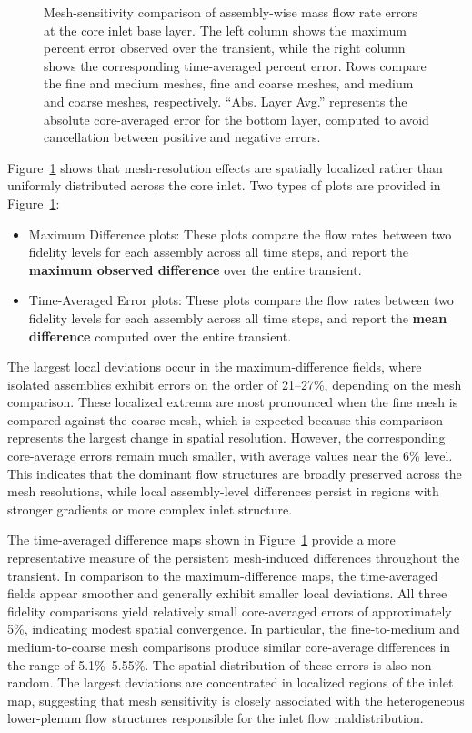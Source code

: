 \documentclass[review]{elsarticle}
\theoremstyle{definition}
\theoremstyle{definition}
\theoremstyle{remark}
\begin{document}
\begin{figure}[h!]
    \caption{Mesh-sensitivity comparison of assembly-wise mass flow rate errors at the core inlet base layer. The left column shows the maximum percent error observed over the transient, while the right column shows the corresponding time-averaged percent error. Rows compare the fine and medium meshes, fine and coarse meshes, and medium and coarse meshes, respectively. ``Abs. Layer Avg.'' represents the absolute core-averaged error for the bottom layer, computed to avoid cancellation between positive and negative errors.}
    \label{fig:Error_Vis_BaseLayer}
\end{figure}

Figure~\ref{fig:Error_Vis_BaseLayer} shows that mesh-resolution effects are spatially localized rather than uniformly distributed across the core inlet. Two types of plots are provided in Figure~\ref{fig:Error_Vis_BaseLayer}:

\begin{itemize}
    \item Maximum Difference plots: These plots compare the flow rates between two fidelity levels for each assembly across all time steps, and report the \textbf{maximum observed difference} over the entire transient.  
    
    \item Time-Averaged Error plots: These plots compare the flow rates between two fidelity levels for each assembly across all time steps, and report the \textbf{mean difference} computed over the entire transient.  
\end{itemize}

The largest local deviations occur in the maximum-difference fields, where isolated assemblies exhibit errors on the order of 21--27\%, depending on the mesh comparison. These localized extrema are most pronounced when the fine mesh is compared against the coarse mesh, which is expected because this comparison represents the largest change in spatial resolution. However, the corresponding core-average errors remain much smaller, with average values near the 6\% level. This indicates that the dominant flow structures are broadly preserved across the mesh resolutions, while local assembly-level differences persist in regions with stronger gradients or more complex inlet structure.

The time-averaged difference maps shown in Figure~\ref{fig:Error_Vis_BaseLayer} provide a more representative measure of the persistent mesh-induced differences throughout the transient. In comparison to the maximum-difference maps, the time-averaged fields appear smoother and generally exhibit smaller local deviations. All three fidelity comparisons yield relatively small core-averaged errors of approximately 5\%, indicating modest spatial convergence. In particular, the fine-to-medium and medium-to-coarse mesh comparisons produce similar core-average differences in the range of 5.1\%--5.55\%. The spatial distribution of these errors is also non-random. The largest deviations are concentrated in localized regions of the inlet map, suggesting that mesh sensitivity is closely associated with the heterogeneous lower-plenum flow structures responsible for the inlet flow maldistribution.
\end{document}
